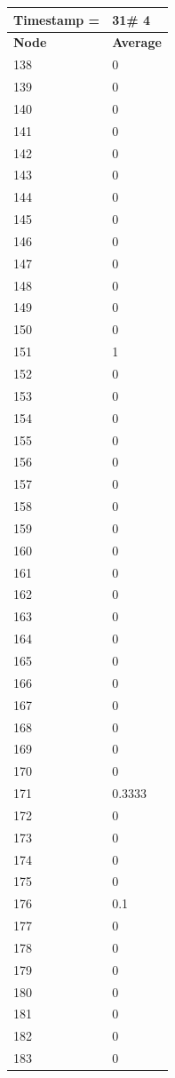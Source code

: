 \begin{tabular}{|l||l|}
\hline
\textbf{Timestamp =} & \textbf{31}\# 4\\\hline
	\textbf{Node} & \textbf{Average} \\ \hline
\hline
	138 & 0 \\ \hline
	139 & 0 \\ \hline
	140 & 0 \\ \hline
	141 & 0 \\ \hline
	142 & 0 \\ \hline
	143 & 0 \\ \hline
	144 & 0 \\ \hline
	145 & 0 \\ \hline
	146 & 0 \\ \hline
	147 & 0 \\ \hline
	148 & 0 \\ \hline
	149 & 0 \\ \hline
	150 & 0 \\ \hline
	151 & 1 \\ \hline
	152 & 0 \\ \hline
	153 & 0 \\ \hline
	154 & 0 \\ \hline
	155 & 0 \\ \hline
	156 & 0 \\ \hline
	157 & 0 \\ \hline
	158 & 0 \\ \hline
	159 & 0 \\ \hline
	160 & 0 \\ \hline
	161 & 0 \\ \hline
	162 & 0 \\ \hline
	163 & 0 \\ \hline
	164 & 0 \\ \hline
	165 & 0 \\ \hline
	166 & 0 \\ \hline
	167 & 0 \\ \hline
	168 & 0 \\ \hline
	169 & 0 \\ \hline
	170 & 0 \\ \hline
	171 & 0.3333 \\ \hline
	172 & 0 \\ \hline
	173 & 0 \\ \hline
	174 & 0 \\ \hline
	175 & 0 \\ \hline
	176 & 0.1 \\ \hline
	177 & 0 \\ \hline
	178 & 0 \\ \hline
	179 & 0 \\ \hline
	180 & 0 \\ \hline
	181 & 0 \\ \hline
	182 & 0 \\ \hline
	183 & 0 \\ \hline
\end{tabular}
